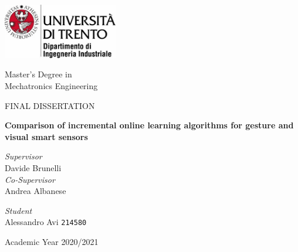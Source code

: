 \documentclass [titlepage]{article}
\begin{document}
\begin{titlepage}

    \includegraphics[width=5cm]{Figures/LogoPiccolo.jpg}

   \begin{center}
       \Large{Master's Degree in\\Mechatronics Engineering}

       \vspace{0.5cm}
       \Large{FINAL DISSERTATION}
       
       \vspace{1.5cm}
        \textbf{\huge{Comparison of incremental online learning algorithms for gesture and visual smart sensors}}
            
   \end{center}
   
   \begin{flushleft}
   \large{\textit{Supervisor}\\
   Davide Brunelli}\\
   
   		\vspace{0.2cm}
   		\large{\textit{Co-Supervisor}\\
   		Andrea Albanese}\\   
   
   		\vspace{0.5cm}
   
   		\large{\textit{Student}\\
   		Alessandro Avi \texttt{214580}}
   \end{flushleft}
   
   
   \vspace*{3cm}
   \begin{center}
       \large{Academic Year 2020/2021}
   \end{center}
\end{titlepage}
\end{document}
